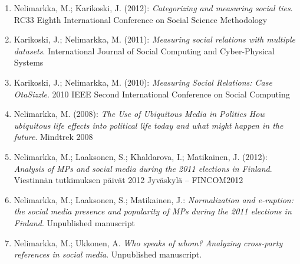 \documentclass{article}
\begin{document}
\begin{enumerate}
\item Nelimarkka, M.; Karikoski, J. (2012): \textit{Categorizing and measuring social ties}. RC33 Eighth International Conference on Social Science Methodology
\item  Karikoski, J.; Nelimarkka, M. (2011): \textit{Measuring social relations with multiple datasets}. International Journal of Social Computing and Cyber-Physical Systems
\item Karikoski, J.; Nelimarkka, M. (2010): \textit{Measuring Social Relations: Case OtaSizzle}. 2010 IEEE Second International Conference on Social Computing
\item Nelimarkka, M. (2008): \textit{The Use of Ubiquitous Media in Politics How ubiquitous life effects into political life today and what might happen in the future}. Mindtrek 2008
\item Nelimarkka, M.; Laaksonen, S.; Khaldarova, I.; Matikainen, J. (2012): \textit{Analysis of MPs and social media during the 2011 elections in Finland}. Viestinnän tutkimuksen päivät 2012 Jyväskylä – FINCOM2012
\item Nelimarkka, M.; Laaksonen, S.; Matikainen, J.: \textit{Normalization and e-ruption: the social media presence and popularity of MPs during the 2011 elections in Finland}. Unpublished manuscript
\item Nelimarkka, M.; Ukkonen, A. \textit{Who speaks of whom? Analyzing cross-party references in social media}. Unpublished manuscript.
\end{enumerate}



\end{document}
